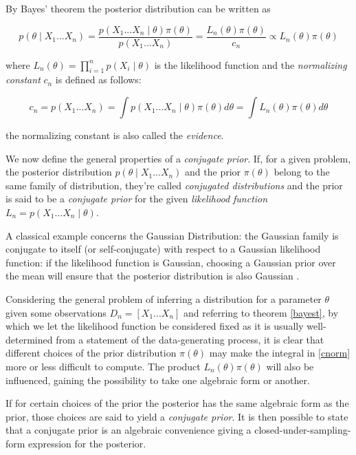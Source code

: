 \documentclass[12pt,openright,twoside,a4paper]{book}
\begin{document}
By Bayes' theorem the posterior distribution can be written as 

\begin{equation}
p(\theta\mid X_1...X_n)= \frac{p(X_1...X_n\mid \theta)\pi(\theta)}{p(X_1...X_n)}=\frac{L_n(\theta)\pi(\theta)}{c_n}\propto L_n(\theta)\pi(\theta)
\label{bayest}
\end{equation}

where $L_n(\theta)=\prod_{i=1}^n p(X_i\mid \theta)$ is the likelihood function and the \textit{normalizing constant} $c_n$ is defined as follows:

\begin{equation}
c_n=p(X_1...X_n)=\int p(X_1...X_n\mid \theta)\pi(\theta)d\theta=\int L_n(\theta)\pi(\theta)d\theta
\label{cnorm}
\end{equation}

the normalizing constant is also called the \textit{evidence}.

We now define the general properties of a \textit{conjugate prior}.
If, for a given problem, the posterior distribution $p(\theta\mid X_1...X_n)$ and the prior $\pi(\theta)$ belong to the same family of distribution, they're called \textit{conjugated distributions} and the prior is said to be a \textit{conjugate prior} for the given \textit{likelihood function} $L_n=p(X_1...X_n\mid \theta)$.

A classical example concerns the Gaussian Distribution: the Gaussian family is conjugate to itself (or self-conjugate) with respect to a Gaussian likelihood function: if the likelihood function is Gaussian, choosing a Gaussian prior over the mean will ensure that the posterior distribution is also Gaussian \cite{CBA}.

Considering the general problem of inferring a distribution for a parameter $\theta$ given some observations $D_n=[X_1...X_n]$ and referring to theorem \ref{bayest}, by which we let the likelihood function be considered fixed as it is usually well-determined from a statement of the data-generating process,  it is clear that different choices of the prior distribution $\pi(\theta)$ may make the integral in \ref{cnorm} more or less difficult to compute.
The product $L_n(\theta)\pi(\theta)$ will also be influenced, gaining the possibility to take one algebraic form or another.

If for certain choices of the prior the posterior has the same algebraic form as the prior, those choices are said to yield a \textit{conjugate prior}.
It is then possible to state that a conjugate prior is an algebraic convenience giving a closed-under-sampling-form expression for the posterior.
\end{document}
